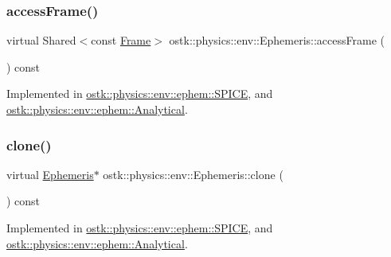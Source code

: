 \subsubsection{\texorpdfstring{access\+Frame()}{accessFrame()}}
{\footnotesize\ttfamily virtual Shared$<$const \hyperlink{classostk_1_1physics_1_1coord_1_1_frame}{Frame}$>$ ostk\+::physics\+::env\+::\+Ephemeris\+::access\+Frame (\begin{DoxyParamCaption}{ }\end{DoxyParamCaption}) const\hspace{0.3cm}{\ttfamily [pure virtual]}}



Implemented in \hyperlink{classostk_1_1physics_1_1env_1_1ephem_1_1_s_p_i_c_e_abf9dee32d47dbb1308af0c9783c84854}{ostk\+::physics\+::env\+::ephem\+::\+S\+P\+I\+CE}, and \hyperlink{classostk_1_1physics_1_1env_1_1ephem_1_1_analytical_a380712abe920ca25b2a3526d4a776033}{ostk\+::physics\+::env\+::ephem\+::\+Analytical}.

\mbox{\label{classostk_1_1physics_1_1env_1_1_ephemeris_a3a35daaff1359882ae16b69ab6e399f6}} 
\subsubsection{\texorpdfstring{clone()}{clone()}}
{\footnotesize\ttfamily virtual \hyperlink{classostk_1_1physics_1_1env_1_1_ephemeris}{Ephemeris}$\ast$ ostk\+::physics\+::env\+::\+Ephemeris\+::clone (\begin{DoxyParamCaption}{ }\end{DoxyParamCaption}) const\hspace{0.3cm}{\ttfamily [pure virtual]}}



Implemented in \hyperlink{classostk_1_1physics_1_1env_1_1ephem_1_1_s_p_i_c_e_af9155765c2546bd8707b56ed86f77c2d}{ostk\+::physics\+::env\+::ephem\+::\+S\+P\+I\+CE}, and \hyperlink{classostk_1_1physics_1_1env_1_1ephem_1_1_analytical_aeb01e31d1fd2d142efa5815ff3a44ea4}{ostk\+::physics\+::env\+::ephem\+::\+Analytical}.

\mbox{\label{classostk_1_1physics_1_1env_1_1_ephemeris_ace5a637a5f25f700dfe1a2cef2b08162}} 
